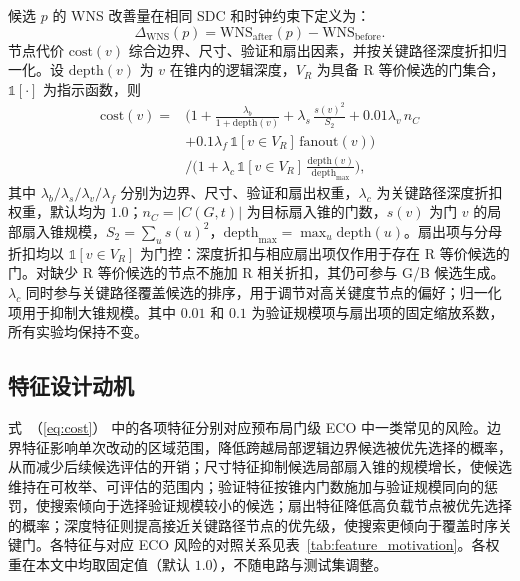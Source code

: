 \documentclass[twocolumn,10pt,fontset=windows]{ctexart}
\renewcommand{\eqref}[1]{\textup{（\ref{#1}）}}
\begin{document}
候选 $p$ 的 WNS 改善量在相同 SDC 和时钟约束下定义为：
\begin{equation}\label{eq:dtiming}
\Delta_{\mathrm{WNS}}(p) = \mathrm{WNS}_{\mathrm{after}}(p) - \mathrm{WNS}_{\mathrm{before}}.
\end{equation}
节点代价 $\mathrm{cost}(v)$ 综合边界、尺寸、验证和扇出因素，并按关键路径深度折扣归一化。设 $\mathrm{depth}(v)$ 为 $v$ 在锥内的逻辑深度，$V_R$ 为具备 R 等价候选的门集合，$\mathbb{1}[\cdot]$ 为指示函数，则
{\small
\begin{equation}
\label{eq:cost}
\begin{aligned}
\mathrm{cost}(v) ={}& \Big(1 + \frac{\lambda_b}{1+\mathrm{depth}(v)}
 + \lambda_s\,\frac{s(v)^2}{S_2}
 + 0.01\lambda_v\,n_C \\
 &+ 0.1\lambda_f\,\mathbb{1}[v{\in}V_R]\,\mathrm{fanout}(v)\Big) \\
 &\Big/\Big(1 + \lambda_c\,\mathbb{1}[v{\in}V_R]\,
 \frac{\mathrm{depth}(v)}{\mathrm{depth}_{\max}}\Big),
\end{aligned}
\end{equation}
}
其中 $\lambda_b/\lambda_s/\lambda_v/\lambda_f$ 分别为边界、尺寸、验证和扇出权重，$\lambda_c$ 为关键路径深度折扣权重，默认均为 $1.0$；$n_C=|C(G,t)|$ 为目标扇入锥的门数，$s(v)$ 为门 $v$ 的局部扇入锥规模，$S_2=\sum_u s(u)^2$，$\mathrm{depth}_{\max}=\max_u \mathrm{depth}(u)$。扇出项与分母折扣均以 $\mathbb{1}[v{\in}V_R]$ 为门控：深度折扣与相应扇出项仅作用于存在 R 等价候选的门。对缺少 R 等价候选的节点不施加 R 相关折扣，其仍可参与 G/B 候选生成。$\lambda_c$ 同时参与关键路径覆盖候选的排序，用于调节对高关键度节点的偏好；归一化项用于抑制大锥规模。其中 $0.01$ 和 $0.1$ 为验证规模项与扇出项的固定缩放系数，所有实验均保持不变。

\subsection{特征设计动机}\label{sec:feature_motivation}

式~\eqref{eq:cost} 中的各项特征分别对应预布局门级 ECO 中一类常见的风险。边界特征影响单次改动的区域范围，降低跨越局部逻辑边界候选被优先选择的概率，从而减少后续候选评估的开销；尺寸特征抑制候选局部扇入锥的规模增长，使候选维持在可枚举、可评估的范围内；验证特征按锥内门数施加与验证规模同向的惩罚，使搜索倾向于选择验证规模较小的候选；扇出特征降低高负载节点被优先选择的概率；深度特征则提高接近关键路径节点的优先级，使搜索更倾向于覆盖时序关键门。各特征与对应 ECO 风险的对照关系见表~\ref{tab:feature_motivation}。各权重在本文中均取固定值（默认 $1.0$），不随电路与测试集调整。
\end{document}
